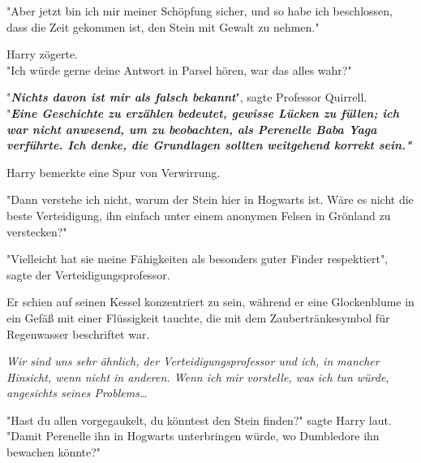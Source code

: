 {"Aber jetzt bin ich mir meiner Schöpfung sicher, und so habe ich beschlossen, dass die Zeit gekommen ist, den Stein mit Gewalt zu nehmen."

Harry zögerte.\\ "Ich würde gerne deine Antwort in Parsel hören, war das alles wahr?"

"\textbf{\emph{Nichts davon ist mir als falsch bekannt}}", sagte Professor Quirrell.\\ "\textbf{\emph{Eine Geschichte zu erzählen bedeutet, gewisse Lücken zu füllen; ich war nicht anwesend, um zu beobachten, als Perenelle Baba Yaga verführte. Ich denke, die Grundlagen sollten weitgehend korrekt sein."}}

Harry bemerkte eine Spur von Verwirrung.

"Dann verstehe ich nicht, warum der Stein hier in Hogwarts ist. Wäre es nicht die beste Verteidigung, ihn einfach unter einem anonymen Felsen in Grönland zu verstecken?"

"Vielleicht hat sie meine Fähigkeiten als besonders guter Finder respektiert", sagte der Verteidigungsprofessor.

Er schien auf seinen Kessel konzentriert zu sein, während er eine Glockenblume in ein Gefäß mit einer Flüssigkeit tauchte, die mit dem Zaubertränkesymbol für Regenwasser beschriftet war.

\emph{Wir sind uns sehr ähnlich, der Verteidigungsprofessor und ich, in mancher Hinsicht, wenn nicht in anderen. Wenn ich mir vorstelle, was ich tun würde, angesichts seines Problems…}

"Hast du allen vorgegaukelt, du könntest den Stein finden?" sagte Harry laut.\\ "Damit Perenelle ihn in Hogwarts unterbringen würde, wo Dumbledore ihn bewachen könnte?"

}
